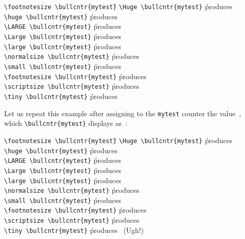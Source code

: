 \documentclass[a4paper]{article}
\DeclareRobustCommand*{\cnt}[1]{\texttt{#1}}
\begin{document}
\begin{tabbing}
	\indent\verb|\footnotesize \bullcntr{mytest}|\hspace{2\tabbingsep}\=\kill
	\> \verb|\Huge \bullcntr{mytest}|
		\' {\Huge produces~}  \\[\W]
	\> \verb|\huge \bullcntr{mytest}|
		\' {\huge produces~}  \\[\W]
	\> \verb|\LARGE \bullcntr{mytest}|
		\' {\LARGE produces~}  \\[\W]
	\> \verb|\Large \bullcntr{mytest}|
		\' {\Large produces~}  \\[\W]
	\> \verb|\large \bullcntr{mytest}|
		\' {\large produces~}  \\[\W]
	\> \verb|\normalsize \bullcntr{mytest}|
		\' {\normalsize produces~}  \\[\W]
	\> \verb|\small \bullcntr{mytest}|
		\' {\small produces~}  \\[\W]
	\> \verb|\footnotesize \bullcntr{mytest}|
		\' {\footnotesize produces~}  \\[\W]
	\> \verb|\scriptsize \bullcntr{mytest}|
		\' {\scriptsize produces~}  \\[\W]
	\> \verb|\tiny \bullcntr{mytest}|
		\' {\tiny produces~}
\end{tabbing}

\setcounter{mytest}{7}

Let us repeat this example after assigning to the \cnt{mytest} counter
the value~, which \verb|\bullcntr{mytest}| displays
as~:

\begin{tabbing}
	\indent\verb|\footnotesize \bullcntr{mytest}|\hspace{2\tabbingsep}\=\kill
	\> \verb|\Huge \bullcntr{mytest}|
		\' {\Huge produces~}  \\[\W]
	\> \verb|\huge \bullcntr{mytest}|
		\' {\huge produces~}  \\[\W]
	\> \verb|\LARGE \bullcntr{mytest}|
		\' {\LARGE produces~}  \\[\W]
	\> \verb|\Large \bullcntr{mytest}|
		\' {\Large produces~}  \\[\W]
	\> \verb|\large \bullcntr{mytest}|
		\' {\large produces~}  \\[\W]
	\> \verb|\normalsize \bullcntr{mytest}|
		\' {\normalsize produces~}  \\[\W]
	\> \verb|\small \bullcntr{mytest}|
		\' {\small produces~}  \\[\W]
	\> \verb|\footnotesize \bullcntr{mytest}|
		\' {\footnotesize produces~}  \\[\W]
	\> \verb|\scriptsize \bullcntr{mytest}|
		\' {\scriptsize produces~}  \\[\W]
	\> \verb|\tiny \bullcntr{mytest}|
		\' {\tiny produces~ (Ugh!)}
\end{tabbing}
\end{document}
